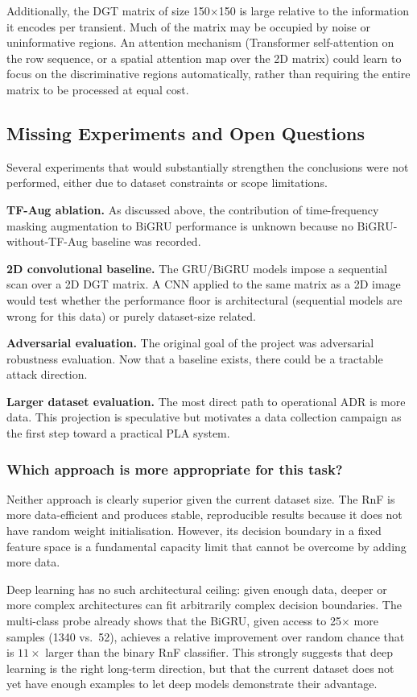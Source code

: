 Additionally, the DGT matrix of size 150$\times$150 is large relative to
the information it encodes per transient.
Much of the matrix may be occupied by noise or uninformative regions.
An attention mechanism (Transformer self-attention on the row sequence, or
a spatial attention map over the 2D matrix) could learn to focus on the
discriminative regions automatically, rather than requiring the entire
matrix to be processed at equal cost.

\subsection{Missing Experiments and Open Questions}

Several experiments that would substantially strengthen the conclusions
were not performed, either due to dataset constraints or scope limitations.

\textbf{TF-Aug ablation.}
As discussed above, the contribution of time-frequency masking augmentation to BiGRU performance
is unknown because no BiGRU-without-TF-Aug baseline was recorded.

\textbf{2D convolutional baseline.}
The GRU/BiGRU models impose a sequential scan over a 2D DGT matrix.
A CNN applied to the same matrix as a 2D image
would test whether the performance floor is architectural (sequential
models are wrong for this data) or purely dataset-size related.

\textbf{Adversarial evaluation.}
The original goal of the project was adversarial robustness evaluation.
Now that a baseline exists, there could be a tractable attack direction.

\textbf{Larger dataset evaluation.}
The most direct path to operational ADR is more data. This projection is speculative but motivates a data collection campaign as the first step toward a practical PLA system.

\subsubsection*{Which approach is more appropriate for this task?}

Neither approach is clearly superior given the current dataset size.
The RnF is more data-efficient and produces stable, reproducible results
because it does not have random weight initialisation.
However, its decision boundary in a fixed feature space is a
fundamental capacity limit that cannot be overcome by adding more data.

Deep learning has no such architectural ceiling: given enough data,
deeper or more complex architectures can fit arbitrarily complex decision
boundaries.
The multi-class probe already shows that the BiGRU, given access to 25$\times$
more samples (1340 vs.\ 52), achieves a relative improvement over random
chance that is $11\times$ larger than the binary RnF classifier.
This strongly suggests that deep learning is the right long-term direction,
but that the current dataset does not yet have enough examples to let deep
models demonstrate their advantage.